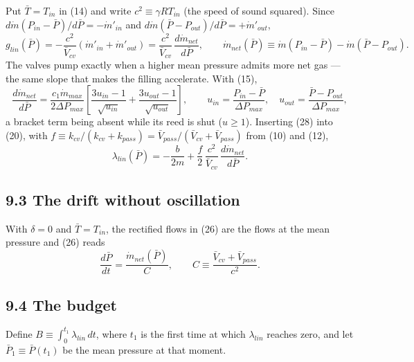 Put $\bar T = T_{in}$ in (14) and write $c^2 \equiv \gamma R T_{in}$ (the speed of sound squared). Since $d\dot m(P_{in} - \bar P)/d\bar P = -\dot m'_{in}$ and $d\dot m(\bar P - P_{out})/d\bar P = +\dot m'_{out}$,
\begin{equation}
g_{lin}(\bar P) = -\frac{c^2}{\bar V_{cv}}\left(\dot m'_{in} + \dot m'_{out}\right) = \frac{c^2}{\bar V_{cv}}\,\frac{d\dot m_{net}}{d\bar P}, \qquad \dot m_{net}(\bar P) \equiv \dot m(P_{in} - \bar P) - \dot m(\bar P - P_{out}) . \tag{28}
\end{equation}
The valves pump exactly when a higher mean pressure admits more net gas --- the same slope that makes the filling accelerate. With (15),
\begin{equation}
\frac{d\dot m_{net}}{d\bar P} = \frac{c_1\dot m_{max}}{2\Delta P_{max}}\left[\frac{3u_{in}-1}{\sqrt{u_{in}}} + \frac{3u_{out}-1}{\sqrt{u_{out}}}\right], \qquad u_{in} = \frac{P_{in} - \bar P}{\Delta P_{max}}, \quad u_{out} = \frac{\bar P - P_{out}}{\Delta P_{max}}, \tag{29}
\end{equation}
a bracket term being absent while its reed is shut ($u \ge 1$). Inserting (28) into (20), with $f \equiv k_{cv}/(k_{cv} + k_{pass}) = \bar V_{pass}/(\bar V_{cv} + \bar V_{pass})$ from (10) and (12),
\begin{equation}
\lambda_{lin}(\bar P) = -\frac{b}{2m} + \frac{f}{2}\,\frac{c^2}{\bar V_{cv}}\,\frac{d\dot m_{net}}{d\bar P} . \tag{30}
\end{equation}

\subsection*{9.3 The drift without oscillation}

With $\delta = 0$ and $\bar T = T_{in}$, the rectified flows in (26) are the flows at the mean pressure and (26) reads
\begin{equation}
\frac{d\bar P}{dt} = \frac{\dot m_{net}(\bar P)}{C}, \qquad C \equiv \frac{\bar V_{cv} + \bar V_{pass}}{c^2} . \tag{31}
\end{equation}

\subsection*{9.4 The budget}

Define $B \equiv \int_0^{t_1}\lambda_{lin}\,dt$, where $t_1$ is the first time at which $\lambda_{lin}$ reaches zero, and let $\bar P_1 \equiv \bar P(t_1)$ be the mean pressure at that moment.

